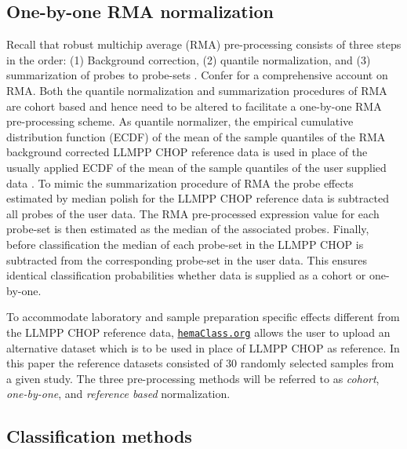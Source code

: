 \documentclass[10pt,letterpaper]{article}
\newcommand{\hemaClass}{\href{http://hemaClass.org}{\texttt{hemaClass.org}}}
\begin{document}




\subsection*{One-by-one RMA normalization}
Recall that robust multichip average (RMA) pre-processing consists of three steps in the order:
(1) Background correction,
(2) quantile normalization, and
(3) summarization of probes to probe-sets \cite{Irizarry2003,Irizarry2003b}.
Confer \cite{Bolstad2004} for a comprehensive account on RMA.
Both the quantile normalization and summarization procedures of RMA are cohort based and hence need to be altered to facilitate a one-by-one RMA pre-processing scheme.
As quantile normalizer, the empirical cumulative distribution function (ECDF) of the mean of the sample quantiles of the RMA background corrected LLMPP CHOP reference data is used in place of the usually applied ECDF of the mean of the sample quantiles of the user supplied data \cite{Bolstad2003}.
To mimic the summarization procedure of RMA \cite{Irizarry2003b} the probe effects estimated by median polish for the LLMPP CHOP reference data is subtracted all probes of the user data.
The RMA pre-processed expression value for each probe-set is then estimated as the median of the associated probes.
Finally, before classification the median of each probe-set in the LLMPP CHOP is subtracted from the corresponding probe-set in the user data.
This ensures identical classification probabilities whether data is supplied as a cohort or one-by-one.

To accommodate laboratory and sample preparation specific effects different from the LLMPP CHOP reference data, \hemaClass{} allows the user to upload an alternative dataset which is to be used in place of LLMPP CHOP as reference.
In this paper the reference datasets consisted of $30$ randomly selected samples from a given study.
The three pre-processing methods will be referred to as \emph{cohort}, \emph{one-by-one}, and \emph{reference based} normalization.


\subsection*{Classification methods}
\end{document}
